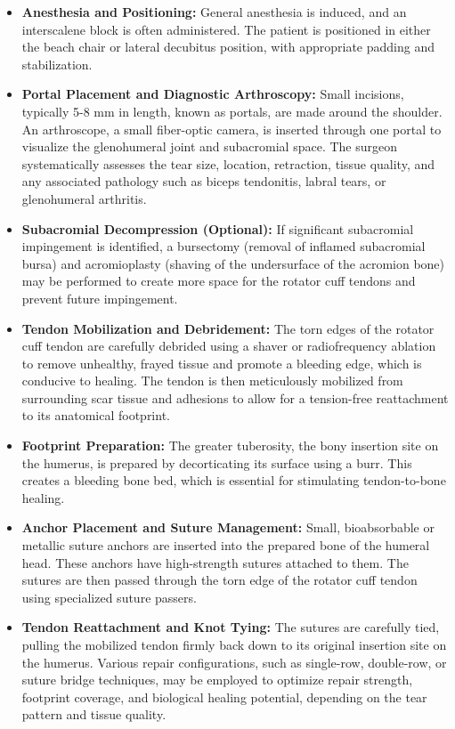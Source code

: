 \begin{itemize}
  \item \textbf{Anesthesia and Positioning:} General anesthesia is induced, and an interscalene block is often administered. The patient is positioned in either the beach chair or lateral decubitus position, with appropriate padding and stabilization.
  \item \textbf{Portal Placement and Diagnostic Arthroscopy:} Small incisions, typically 5-8 mm in length, known as portals, are made around the shoulder. An arthroscope, a small fiber-optic camera, is inserted through one portal to visualize the glenohumeral joint and subacromial space. The surgeon systematically assesses the tear size, location, retraction, tissue quality, and any associated pathology such as biceps tendonitis, labral tears, or glenohumeral arthritis.
  \item \textbf{Subacromial Decompression (Optional):} If significant subacromial impingement is identified, a bursectomy (removal of inflamed subacromial bursa) and acromioplasty (shaving of the undersurface of the acromion bone) may be performed to create more space for the rotator cuff tendons and prevent future impingement.
  \item \textbf{Tendon Mobilization and Debridement:} The torn edges of the rotator cuff tendon are carefully debrided using a shaver or radiofrequency ablation to remove unhealthy, frayed tissue and promote a bleeding edge, which is conducive to healing. The tendon is then meticulously mobilized from surrounding scar tissue and adhesions to allow for a tension-free reattachment to its anatomical footprint.
  \item \textbf{Footprint Preparation:} The greater tuberosity, the bony insertion site on the humerus, is prepared by decorticating its surface using a burr. This creates a bleeding bone bed, which is essential for stimulating tendon-to-bone healing.
  \item \textbf{Anchor Placement and Suture Management:} Small, bioabsorbable or metallic suture anchors are inserted into the prepared bone of the humeral head. These anchors have high-strength sutures attached to them. The sutures are then passed through the torn edge of the rotator cuff tendon using specialized suture passers.
  \item \textbf{Tendon Reattachment and Knot Tying:} The sutures are carefully tied, pulling the mobilized tendon firmly back down to its original insertion site on the humerus. Various repair configurations, such as single-row, double-row, or suture bridge techniques, may be employed to optimize repair strength, footprint coverage, and biological healing potential, depending on the tear pattern and tissue quality.

\end{itemize}
